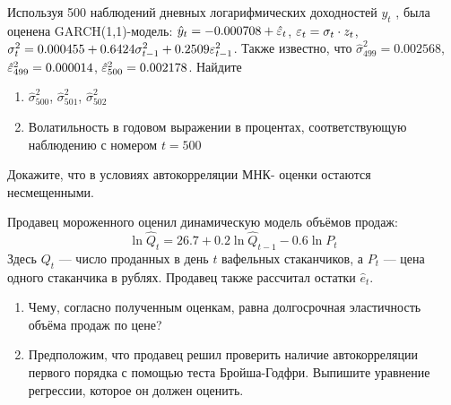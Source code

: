 \documentclass[pdftex,11pt,openany]{book}\usepackage[]{graphicx}\usepackage[]{color}
\begin{document}
\begin{solution}
\end{solution}


\begin{problem}
Используя 500 наблюдений дневных логарифмических доходностей $y_t$ ,
была оценена GARCH(1,1)-модель: $\hat{y}_t=-0.000708+\hat{\varepsilon}_t$, $\varepsilon_t=\sigma_t \cdot z_t$, $\sigma^2_t=0.000455+0.6424\sigma^2_{t-1}+0.2509\varepsilon^2_{t-1}$. Также известно, что $\hat{\sigma}^2_{499}=0.002568$, $\hat{\varepsilon}^2_{499}=0.000014$, $\hat{\varepsilon}^2_{500}=0.002178$.
Найдите 
\begin{enumerate}
\item  $\hat{\sigma}^2_{500}$, $\hat{\sigma}^2_{501}$, $\hat{\sigma}^2_{502}$
\item Волатильность в годовом выражении в процентах, соответствующую
наблюдению с номером $t = 500$
\end{enumerate}
\end{problem}

\begin{solution}
\end{solution}


\begin{problem}
Докажите, что в условиях автокорреляции МНК-
оценки остаются несмещенными.
\end{problem}

\begin{solution}
\end{solution}


\begin{problem}
Продавец мороженного оценил динамическую модель объёмов продаж:
\[
\ln \hat{Q}_t=26.7 + 0.2\ln \hat{Q}_{t-1}-0.6\ln P_t
\]
Здесь $Q_t$ --- число проданных в день $t$ вафельных стаканчиков, а $P_t$ --- цена одного стаканчика в рублях. Продавец также рассчитал остатки $\hat{e}_t$.
\begin{enumerate}
\item Чему, согласно полученным оценкам, равна долгосрочная эластичность объёма продаж по цене?
\item Предположим, что продавец решил проверить наличие автокорреляции первого порядка с помощью теста Бройша-Годфри. Выпишите уравнение регрессии, которое он должен оценить.  
\end{enumerate}
\end{problem}

\begin{solution}
\end{solution}
\end{document}
